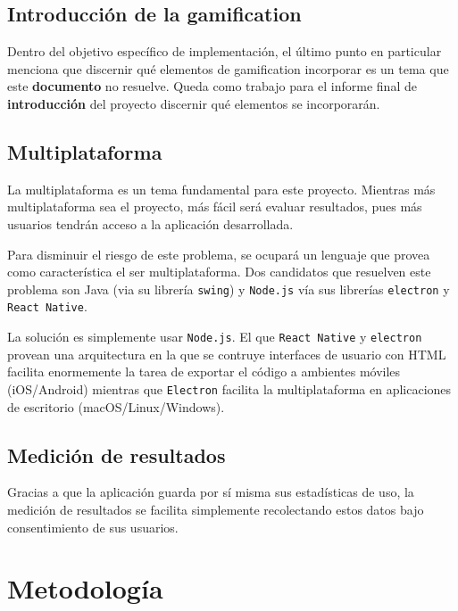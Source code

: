 \documentclass[12pt,letterpaper]{report}
\begin{document}
\hypertarget{introducciuxf3n-de-la-gamification}{%
\subsection{Introducción de la
gamification}\label{introducciuxf3n-de-la-gamification}}

Dentro del objetivo específico de implementación, el último punto en
particular menciona que discernir qué elementos de gamification
incorporar es un tema que este \textbf{documento} no resuelve. Queda
como trabajo para el informe final de \textbf{introducción} del proyecto
discernir qué elementos se incorporarán.

\hypertarget{multiplataforma}{%
\subsection{Multiplataforma}\label{multiplataforma}}

La multiplataforma es un tema fundamental para este proyecto. Mientras
más multiplataforma sea el proyecto, más fácil será evaluar resultados,
pues más usuarios tendrán acceso a la aplicación desarrollada.

Para disminuir el riesgo de este problema, se ocupará un lenguaje que provea
como característica el ser multiplataforma. Dos candidatos que resuelven este
problema son Java (via su librería \texttt{swing}) y \texttt{Node.js} vía sus
librerías \texttt{electron}\cite{electron} y \texttt{React\
Native}\cite{react-native}.

La solución es simplemente usar \texttt{Node.js}. El que \texttt{React Native}
y \texttt{electron} provean una arquitectura en la que se contruye interfaces
de usuario con HTML facilita enormemente la tarea de exportar el código a
ambientes móviles (iOS/Android) mientras que \texttt{Electron} facilita la
multiplataforma en aplicaciones de escritorio (macOS/Linux/Windows).

\hypertarget{mediciuxf3n-de-resultados}{%
\subsection{Medición de resultados}\label{mediciuxf3n-de-resultados}}

Gracias a que la aplicación guarda por sí misma sus estadísticas de uso,
la medición de resultados se facilita simplemente recolectando estos
datos bajo consentimiento de sus usuarios.

\newpage
\hypertarget{metodologuxeda}{%
\section{Metodología}\label{metodologuxeda}}
\end{document}
